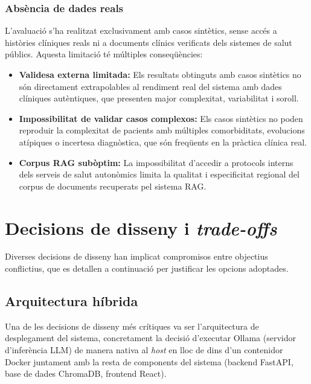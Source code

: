 \documentclass[CAT]{TFUOC}%
\begin{document}
\subsubsection{Absència de dades reals}

L'avaluació s'ha realitzat exclusivament amb casos sintètics, sense accés a històries clíniques reals ni a documents clínics verificats dels sistemes de salut públics. Aquesta limitació té múltiples conseqüències:

\begin{itemize}
    \item \textbf{Validesa externa limitada:} Els resultats obtinguts amb casos sintètics no són directament extrapolables al rendiment real del sistema amb dades clíniques autèntiques, que presenten major complexitat, variabilitat i soroll.
    
    \item \textbf{Impossibilitat de validar casos complexos:} Els casos sintètics no poden reproduir la complexitat de pacients amb múltiples comorbiditats, evolucions atípiques o incertesa diagnòstica, que són freqüents en la pràctica clínica real.
    
    \item \textbf{Corpus RAG subòptim:} La impossibilitat d'accedir a protocols interns dels serveis de salut autonòmics limita la qualitat i especificitat regional del corpus de documents recuperats pel sistema RAG.
\end{itemize}

\section{Decisions de disseny i \textit{trade-offs}}

Diverses decisions de disseny han implicat compromisos entre objectius conflictius, que es detallen a continuació per justificar les opcions adoptades.

\subsection{Arquitectura híbrida}

Una de les decisions de disseny més crítiques va ser l'arquitectura de desplegament del sistema, concretament la decisió d'executar Ollama (servidor d'inferència LLM) de manera nativa al \textit{host} en lloc de dins d'un contenidor Docker juntament amb la resta de components del sistema (backend FastAPI, base de dades ChromaDB, frontend React).
\end{document}
